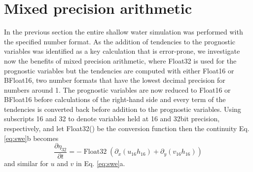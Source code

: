 \documentclass[draft]{agujournal2019}
\newcommand{\op}{\operatorname}
\begin{document}
\section{Mixed precision arithmetic}
\label{sec:mixed}

In the previous section the entire shallow water simulation was performed with the specified number format. As the addition of tendencies to the prognostic variables was identified as a key calculation that is error-prone, we investigate now the benefits of mixed precision arithmetic, where Float32 is used for the prognostic variables but the tendencies are computed with either Float16 or BFloat16, two number formats that have the lowest decimal precision for numbers around 1. The prognostic variables are now reduced to Float16 or BFloat16 before calculations of the right-hand side and every term of the tendencies is converted back before addition to the prognostic variables. Using subscripts 16 and 32 to denote variables held at 16 and 32bit precision, respectively, and let Float32() be the conversion function then the continuity Eq. \ref{eq:swe}b becomes
\begin{equation}
\frac{\partial \eta_{32}}{\partial t} = -\op{Float32}( \partial_x(u_{16}h_{16}) + \partial_y(v_{16}h_{16} ))
\label{eq:conversion}
\end{equation}
and similar for $u$ and $v$ in Eq. \ref{eq:swe}a.
\end{document}
